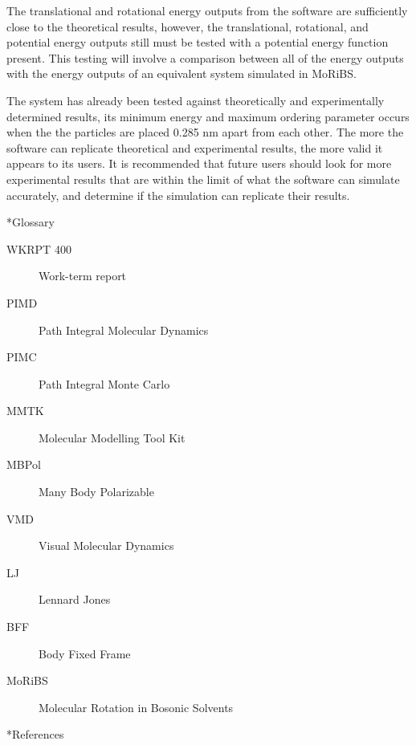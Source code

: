\documentclass[11pt]{article}
\makeatletter
\let\workreportsection\section
\renewcommand{\section}{\@ifstar{\workreportstarsection}{\workreportsection}}
\newcommand{\workreportstarsection}[1]{\workreportsection*{#1}\addcontentsline{toc}{section}{#1}}
\makeatother
\begin{document}
The translational and rotational energy outputs from the software are sufficiently close to the theoretical results, however, the translational, rotational, and potential energy outputs still must be tested with a potential energy function present. This testing will involve a comparison between all of the energy outputs with the energy outputs of an equivalent system simulated in MoRiBS. 

The system has already been tested against theoretically and experimentally determined results, its minimum energy and maximum ordering parameter occurs when the the particles are placed 0.285 nm apart from each other. The more the software can replicate theoretical and experimental results, the more valid it appears to its users. It is recommended that future users should look for more experimental results that are within the limit of what the software can simulate accurately, and determine if the simulation can replicate their results. 







\section*{Glossary}
\label{wr-front-glossary-1}
\begin{description}
\item[WKRPT 400] Work-term report
\item[PIMD] Path Integral Molecular Dynamics
\item[PIMC] Path Integral Monte Carlo
\item[MMTK] Molecular Modelling Tool Kit
\item[MBPol] Many Body Polarizable
\item[VMD] Visual Molecular Dynamics
\item[LJ] Lennard Jones
\item[BFF] Body Fixed Frame
\item[MoRiBS] Molecular Rotation in Bosonic Solvents
\end{description}









\section*{References}
\label{wr-front-references-1}
\end{document}
